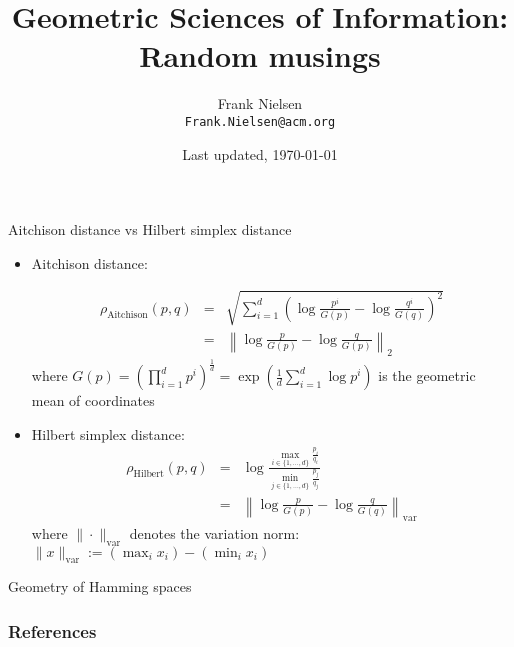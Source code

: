 \documentclass{beamer}
\begin{document}
\title{Geometric Sciences of Information:\\ Random musings}
 
\date{Last updated, \today}

\author{Frank Nielsen\\ {\tt Frank.Nielsen@acm.org}}
 
\begin{frame}
\titlepage
\end{frame}


\begin{frame}{Aitchison distance vs Hilbert simplex distance}

\begin{itemize}
	\item Aitchison distance:
	
\begin{eqnarray*}
\rho_{\mathrm{Aitchison}}(p,q) &=& \sqrt{\sum_{i=1}^d \left( \log \frac{p^i}{G(p)}-\log \frac{q^i}{G(q)} \right)^2}\\
&=& \left\|\log\frac{p}{G(p)}-\log\frac{q}{G(p)}\right\|_2
\end{eqnarray*}
where $G(p)=\left(\prod_{i=1}^d p^i\right)^{\frac{1}{d}}=\exp\left(\frac{1}{d}\sum_{i=1}^d \log p^i\right)$ is the geometric mean of coordinates

\item Hilbert simplex distance: 
\begin{eqnarray*}
\rho_{\mathrm{Hilbert}}(p,q) &=&  \log \frac{\max _{i\in\{1,\ldots, d\}} \frac{p_{i}}{q_{i}}}{\min _{j\in\{1,\ldots, d\}} \frac{p_{j}}{q_{j}}}\\
&=& \left\|\log\frac{p}{G(p)}-\log\frac{q}{G(q)} \right\|_{\mathrm{var}}
\end{eqnarray*}
where $\|\cdot\|_{\mathrm{var}}$ denotes the variation norm: $\|x\|_{\mathrm{var}}:= (\max_i x_i)-(\min_i x_i)$
\end{itemize}
\end{frame}


\begin{frame}{Geometry of Hamming spaces}
\end{frame}


\begin{frame}[allowframebreaks]
        \frametitle{References}
				\tiny


\end{frame}
\end{document}
